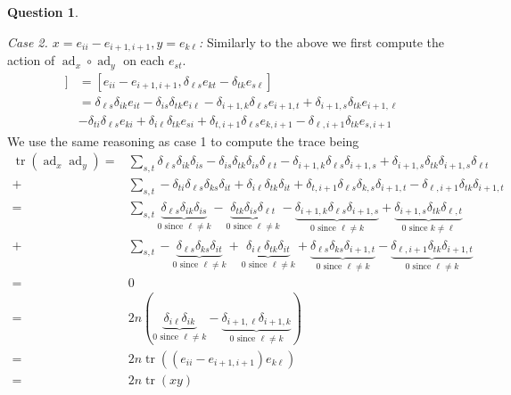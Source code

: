 \documentclass[10.5pt]{article}
\theoremstyle{definition}
\newtheorem{pb}{Question}
\numberwithin{example}{subsection}
\numberwithin{proposition}{subsection}
\begin{document}
\begin{pb}
\begin{enumerate}
            \emph{Case 2. \(x = e_{ii} - e_{i+1,i+1}, y = e_{k\ell}\):} Similarly to the above we first compute the action of \(\operatorname{ad}_x \circ \operatorname{ad}_y\) on each \(e_{st}\).
            \begin{align}
                [e_{ii} - e_{i+1,i+1},[e_{k\ell},e_{s,t}]] &= [e_{ii} - e_{i+1,i+1},\delta_{\ell s}e_{kt} - \delta_{tk}e_{s\ell}] \\ 
                &= \delta_{\ell s}\delta_{ik}e_{it} - \delta_{is}\delta_{tk}e_{i\ell} - \delta_{i+1,k}\delta_{\ell s}e_{i+1,t} + \delta_{i+1,s}\delta_{tk}e_{i+1,\ell} \\
                &- \delta_{ti}\delta_{\ell s}e_{ki} + \delta_{i \ell}\delta_{tk}e_{si} + \delta_{t,i+1}\delta_{\ell s} e_{k,i+1} - \delta_{\ell,i+1}\delta_{tk}e_{s,i+1}
            \end{align}
            We use the same reasoning as case 1 to compute the trace being
            \begin{align}
                \operatorname{tr}(\operatorname{ad}_x \operatorname{ad}_y) = &\sum_{s,t} \delta_{\ell s}\delta_{ik}\delta_{is} - \delta_{is}\delta_{tk}\delta_{is}\delta_{\ell t} - \delta_{i+1,k}\delta_{\ell s}\delta_{i+1,s} + \delta_{i+1,s}\delta_{tk}\delta_{i+1,s}\delta_{\ell t}\\
                +&\sum_{s,t} -\delta_{ti}\delta_{\ell s}\delta_{ks}\delta_{it} + \delta_{i \ell}\delta_{tk}\delta_{it} + \delta_{t,i+1}\delta_{\ell s} \delta_{k,s}\delta_{i+1,t} - \delta_{\ell,i+1}\delta_{tk}\delta_{i+1,t} \\
                = &\sum_{s,t} \underbrace{\delta_{\ell s}\delta_{ik}\delta_{is}}_{0 \text{ since } \ell \neq k} - \underbrace{\delta_{tk}\delta_{is}\delta_{\ell t}}_{0 \text{ since } \ell \neq k} - \underbrace{\delta_{i+1,k}\delta_{\ell s}\delta_{i+1,s}}_{0 \text{ since } \ell \neq k} + \underbrace{\delta_{i+1,s}\delta_{tk}\delta_{\ell,t}}_{0 \text{ since } k \neq \ell} \\
                +&\sum_{s,t} -\underbrace{\delta_{\ell s}\delta_{ks}\delta_{it}}_{0 \text{ since } \ell \neq k} + \underbrace{\delta_{i \ell}\delta_{tk}\delta_{it}}_{0 \text{ since } \ell \neq k} + \underbrace{\delta_{\ell s} \delta_{ks}\delta_{i+1,t}}_{0 \text{ since } \ell \neq k} - \underbrace{\delta_{\ell,i+1}\delta_{tk}\delta_{i+1,t}}_{0 \text{ since } \ell \neq k} \\
                = &0 \\
                = &2n(\underbrace{\delta_{i\ell}\delta_{ik}}_{0 \text{ since } \ell \neq k} - \underbrace{\delta_{i+1,\ell}\delta_{i+1,k}}_{0 \text{ since } \ell \neq k}) \\
                = &2n\operatorname{tr}((e_{ii} - e_{i+1,i+1})e_{k\ell}) \\
                = &2n \operatorname{tr}(xy)
            \end{align}


\end{enumerate}
\end{pb}
\end{document}
